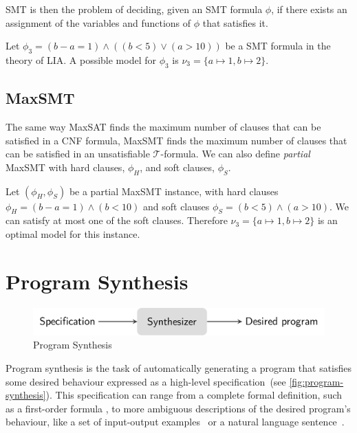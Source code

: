 \ac{SMT} is then the problem of deciding, given an SMT formula \(\phi\), if there exists an assignment of the variables and functions of \(\phi\) that satisfies it.

\begin{example}
Let \(\phi_3 = (b - a = 1) \land ((b<5) \lor (a>10))\) be a \ac{SMT} formula in the theory of LIA. A possible model for \(\phi_3\) is \(\nu_3 = \{a \mapsto 1, b \mapsto 2\}\).
\end{example}


\subsection{\acl{MaxSMT}}

The same way \ac{MaxSAT} finds the maximum number of clauses that can be satisfied in a \ac{CNF} formula, \ac{MaxSMT} finds the maximum number of clauses that can be satisfied in an unsatisfiable \(\mathcal{T}\)-formula.
We can also define \textit{partial} \ac{MaxSMT} with hard clauses, \(\phi_H\), and soft clauses, \(\phi_S\).

\begin{example}
Let \((\phi_{H}, \phi_{S})\) be a partial \ac{MaxSMT} instance, with hard clauses \(\phi_{H}=(b-a=1) \land (b<10)\) and soft clauses \(\phi_{S} = (b<5) \land (a>10)\). We can satisfy at most one of the soft clauses. Therefore \(\nu_3 = \{a \mapsto 1, b \mapsto 2\}\) is an optimal model for this instance.
\end{example}

\section{Program Synthesis} \label{sec:back-ps}
\begin{figure}
    \centering
    \includegraphics[scale=.35]{pictures/program_synthesis.pdf}
    \caption{Program Synthesis}
    \label{fig:program-synthesis}
\end{figure}

Program synthesis is the task of automatically generating a program that satisfies some desired behaviour expressed as a high-level specification~(see \autoref{fig:program-synthesis}).
This specification can range from a complete formal definition, such as a first-order formula \cite{DBLP:conf/ijcai/Green69,DBLP:conf/pldi/GulwaniJTV11}, to more ambiguous descriptions of the desired program's behaviour, like a set of input-output examples~\cite{DBLP:conf/iclr/BalogGBNT17,DBLP:conf/pldi/FengMBD18,DBLP:conf/icse/JhaGST10,DBLP:conf/ijcai/ShawWG75,DBLP:journals/jacm/Summers77,DBLP:conf/aaai/ManshadiGA13,DBLP:conf/ijcai/RazaGM15,DBLP:conf/aaai/MortonHSPS20} or a natural language sentence~\cite{DBLP:conf/icse/DesaiGHJKMRR16,DBLP:journals/pacmpl/Yaghmazadeh0DD17,DBLP:conf/naacl/HuangWSYH18,Regel20,DBLP:conf/aaai/ManshadiGA13,DBLP:conf/ijcai/RazaGM15}.

